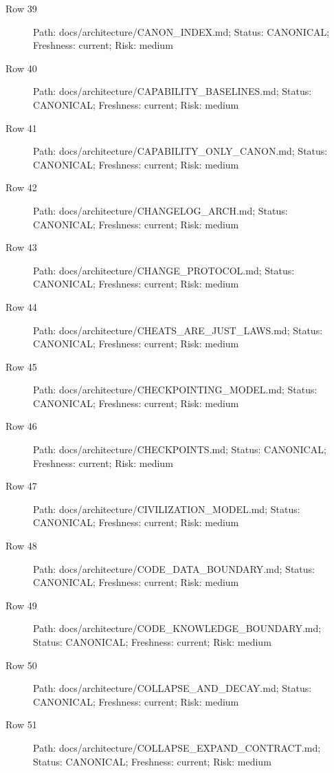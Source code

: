 \documentclass[10.5pt,a4paper,openany]{book}
\begin{document}
\begin{description}
\item[Row 39] Path: docs/\allowbreak{}architecture/\allowbreak{}CANON\_\allowbreak{}INDEX.\allowbreak{}md; Status: CANONICAL; Freshness: current; Risk: medium
\item[Row 40] Path: docs/\allowbreak{}architecture/\allowbreak{}CAPABILITY\_\allowbreak{}BASELINES.\allowbreak{}md; Status: CANONICAL; Freshness: current; Risk: medium
\item[Row 41] Path: docs/\allowbreak{}architecture/\allowbreak{}CAPABILITY\_\allowbreak{}ONLY\_\allowbreak{}CANON.\allowbreak{}md; Status: CANONICAL; Freshness: current; Risk: medium
\item[Row 42] Path: docs/\allowbreak{}architecture/\allowbreak{}CHANGELOG\_\allowbreak{}ARCH.\allowbreak{}md; Status: CANONICAL; Freshness: current; Risk: medium
\item[Row 43] Path: docs/\allowbreak{}architecture/\allowbreak{}CHANGE\_\allowbreak{}PROTOCOL.\allowbreak{}md; Status: CANONICAL; Freshness: current; Risk: medium
\item[Row 44] Path: docs/\allowbreak{}architecture/\allowbreak{}CHEATS\_\allowbreak{}ARE\_\allowbreak{}JUST\_\allowbreak{}LAWS.\allowbreak{}md; Status: CANONICAL; Freshness: current; Risk: medium
\item[Row 45] Path: docs/\allowbreak{}architecture/\allowbreak{}CHECKPOINTING\_\allowbreak{}MODEL.\allowbreak{}md; Status: CANONICAL; Freshness: current; Risk: medium
\item[Row 46] Path: docs/\allowbreak{}architecture/\allowbreak{}CHECKPOINTS.\allowbreak{}md; Status: CANONICAL; Freshness: current; Risk: medium
\item[Row 47] Path: docs/\allowbreak{}architecture/\allowbreak{}CIVILIZATION\_\allowbreak{}MODEL.\allowbreak{}md; Status: CANONICAL; Freshness: current; Risk: medium
\item[Row 48] Path: docs/\allowbreak{}architecture/\allowbreak{}CODE\_\allowbreak{}DATA\_\allowbreak{}BOUNDARY.\allowbreak{}md; Status: CANONICAL; Freshness: current; Risk: medium
\item[Row 49] Path: docs/\allowbreak{}architecture/\allowbreak{}CODE\_\allowbreak{}KNOWLEDGE\_\allowbreak{}BOUNDARY.\allowbreak{}md; Status: CANONICAL; Freshness: current; Risk: medium
\item[Row 50] Path: docs/\allowbreak{}architecture/\allowbreak{}COLLAPSE\_\allowbreak{}AND\_\allowbreak{}DECAY.\allowbreak{}md; Status: CANONICAL; Freshness: current; Risk: medium
\item[Row 51] Path: docs/\allowbreak{}architecture/\allowbreak{}COLLAPSE\_\allowbreak{}EXPAND\_\allowbreak{}CONTRACT.\allowbreak{}md; Status: CANONICAL; Freshness: current; Risk: medium

\end{description}
\end{document}
